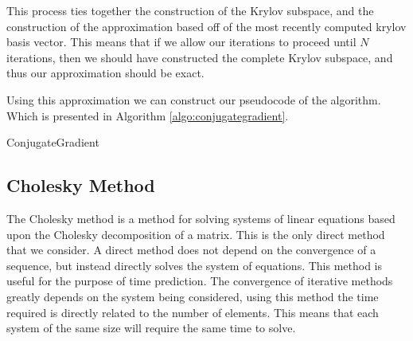 \documentclass[../fem.tex]{subfile}
\begin{document}
This process ties together the construction of the Krylov subspace, and the
construction of the approximation based off of the most recently computed
krylov basis vector. This means that if we allow our iterations to proceed
until $N$ iterations, then we should have constructed the complete Krylov
subspace, and thus our approximation should be exact.

Using this approximation we can construct our pseudocode of the algorithm. Which
is presented in Algorithm \ref{algo:conjugategradient}.

\begin{algorithm}[H]
  \caption{ConjugateGradient}\label{algo:conjugategradient}
  \begin{algorithmic}
    \Else
    \EndIf
    \EndIf
    \EndFor
  \end{algorithmic}
\end{algorithm}

\subsection{Cholesky Method}%
\label{sub:cholesky_method}

The Cholesky method is a method for solving systems of linear equations based
upon the Cholesky decomposition of a matrix. This is the only direct method
that we consider. A direct method does not depend on the convergence of a sequence,
but instead directly solves the system of equations. This method is useful for
the purpose of time prediction. The convergence of iterative methods greatly
depends on the system being considered, using this method the time required is
directly related to the number of elements. This means that each system of the
same size will require the same time to solve.

%      
\end{document}
